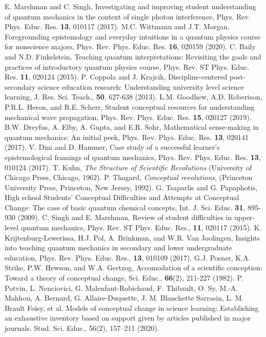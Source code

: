 \documentclass[twocolumn,secnumarabic,amssymb, nobibnotes, aps, prd, nofootinbib]{revtex4-2}
\begin{document}
\begin{thebibliography}{99}
 E. Marshman and C. Singh, Investigating and improving student understanding of quantum mechanics in the context of single photon interference, Phys. Rev. Phys. Educ. Res. \textbf{13}, 010117 (2017).
 M.C. Wittmann and J.T. Morgan, Foregrounding epistemology and everyday intuitions in a quantum physics course for nonscience majors, Phys. Rev. Phys. Educ. Res. \textbf{16}, 020159 (2020).
 C. Baily and N.D. Finkelstein, Teaching quantum interpretations: Revisiting the goals and practices of introductory quantum physics course, Phys. Rev. ST Phys. Educ. Res. \textbf{11}, 020124 (2015).
 P. Coppola and J. Krajcik, Discipline-centered post-secondary science education research: Understanding university level science learning, J. Res. Sci. Teach., \textbf{50}, 627-638 (2013).
 L.M. Goodhew, A.D. Robertson, P.R.L. Heron, and R.E. Scherr, Student conceptual resources for understanding mechanical wave propagation, Phys. Rev. Phys. Educ. Res. \textbf{15}, 020127 (2019).
 B.W. Dreyfus, A. Elby, A. Gupta, and E.R. Sohr, Mathematical sense-making in quantum mechanics: An initial peek, Phys. Rev. Phys. Educ. Res. \textbf{13}, 020141 (2017).
 V. Dini and D. Hammer, Case study of a successful learner's epistemological framings of quantum mechanics, Phys. Rev. Phys. Educ. Res. \textbf{13}, 010124 (2017).
 T. Kuhn, \textit{The Structure of Scientific Revolutions} (University of Chicago Press, Chicago, 1962).
 P. Thagard, \textit{Conceptual revolutions}, (Princeton University Press, Princeton, New Jersey, 1992).
 G. Tsaparlis and G. Papaphotis, High school Students' Conceptual Difficulties and Attempts at Conceptual Change: The case of basic quantum chemical concepts, Int. J. Sci. Educ. \textbf{31}, 895-930 (2009).
 C. Singh and E. Marshman, Review of student difficulties in upper-level quantum mechanics, Phys. Rev. ST Phys. Educ. Res., \textbf{11}, 020117 (2015).
 K. Krijtenburg-Lewerissa, H.J. Pol, A. Brinkman, and W.R. Van Joolingen, Insights into teaching quantum mechanics in secondary and lower undergraduate education, Phys. Rev. Phys. Educ. Res., \textbf{13}, 010109 (2017).
 G.J. Posner, K.A. Strike, P.W. Hewson, and W.A. Gertzog, Accomodation of a scientific conception: Toward a theory of conceptual change, Sci. Educ., \textbf{66}(2), 211-227 (1982).
 P. Potvin, L. Nenciovici, G. Malenfant-Robichaud, F. Thibault, O. Sy, M.-A. Mahhou, A. Bernard, G. Allaire-Duquette, J. M. Blanchette Sarrasin, L. M. Brault Foisy, et al. Models of conceptual change in science learning: Establishing an exhaustive inventory based on support given by articles published in major journals. Stud. Sci. Educ., 56(2), 157–211 (2020).

\end{thebibliography}
\end{document}
